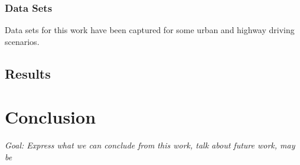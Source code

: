 \subsubsection*{Data Sets}
Data sets for this work have been captured for some urban and highway driving scenarios.

\subsection{Results}


\section{Conclusion}

\textit{Goal: Express what we can conclude from this work, talk about future work, may be}